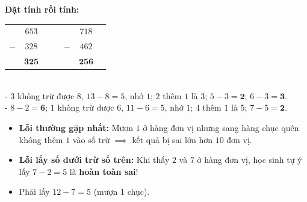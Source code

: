 \documentclass[10pt,a4paper]{article}
\begin{document}
\vspace{-1.5mm}
\noindent
\begin{minipage}[t]{0.49\textwidth}\vspace{0pt}
\begin{tcolorbox}[
  enhanced,
  colback=green!4!white,
  colframe=green!60!black,
  arc=2mm, boxrule=0.8pt,
  left=2mm, right=2mm, top=1.8mm, bottom=1.8mm,
  title={\footnotesize\bfseries\color{white}\faCheckCircle\ 4. Ví dụ thực hành đặt tính}
]
{\footnotesize
\textbf{Đặt tính rồi tính:}\\
\begin{tabular}{r@{\,}c@{\,}lcr@{\,}c@{\,}l}
  & $653$ & & & & $718$ & \\
$-$ & $328$ & & &$-$ & $462$ & \\
\cline{1-3}\cline{5-7}
  & $\mathbf{325}$ & & & & $\mathbf{256}$ &
\end{tabular}
\vspace{1mm}\\
- $3$ không trừ được $8$, $13 - 8 = 5$, nhớ $1$; $2$ thêm $1$ là $3$; $5 - 3 = \mathbf{2}$; $6 - 3 = \mathbf{3}$.\\
- $8 - 2 = \mathbf{6}$; $1$ không trừ được $6$, $11 - 6 = 5$, nhớ $1$; $4$ thêm $1$ là $5$; $7 - 5 = \mathbf{2}$.
}
\end{tcolorbox}
\end{minipage}
\hfill
\begin{minipage}[t]{0.49\textwidth}\vspace{0pt}
\begin{tcolorbox}[
  enhanced,
  colback=rose!4!white,
  colframe=rose!70!black,
  arc=2mm, boxrule=0.8pt,
  left=2mm, right=2mm, top=1.8mm, bottom=1.8mm,
  title={\footnotesize\bfseries\color{white}\faExclamationTriangle\ 5. Lỗi quên trả nhớ tai hại}
]
{\footnotesize
\begin{itemize}\setlength{\itemsep}{1.5pt}\setlength{\leftskip}{-2.5mm}
  \item \textbf{Lỗi thường gặp nhất:} Mượn $1$ ở hàng đơn vị nhưng sang hàng chục quên không thêm $1$ vào số trừ $\implies$ kết quả bị sai lớn hơn $10$ đơn vị.
  \item \textbf{Lỗi lấy số dưới trừ số trên:} Khi thấy $2$ và $7$ ở hàng đơn vị, học sinh tự ý lấy $7 - 2 = 5$ là \textbf{hoàn toàn sai}!
  \item Phải lấy $12 - 7 = 5$ (mượn 1 chục).
\end{itemize}
}
\end{tcolorbox}
\end{minipage}
\end{document}
